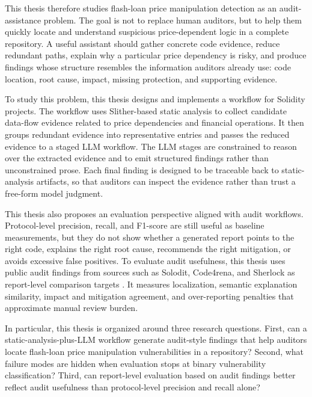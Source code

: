 This thesis therefore studies flash-loan price manipulation detection as an
audit-assistance problem. The goal is not to replace human auditors, but to
help them quickly locate and understand suspicious price-dependent logic in a
complete repository. A useful assistant should gather concrete code evidence,
reduce redundant paths, explain why a particular price dependency is risky, and
produce findings whose structure resembles the information auditors already use:
code location, root cause, impact, missing protection, and supporting evidence.

To study this problem, this thesis designs and implements a workflow
for Solidity projects. The workflow uses Slither-based static analysis
\citep{slither} to collect candidate data-flow evidence related to price
dependencies and financial operations. It then groups redundant evidence into
representative entries and passes the reduced evidence to a staged LLM workflow.
The LLM stages are constrained to reason over the extracted evidence and to
emit structured findings rather than unconstrained prose. Each final finding is
designed to be traceable back to static-analysis artifacts, so that auditors can
inspect the evidence rather than trust a free-form model judgment.

This thesis also proposes an evaluation perspective aligned with audit
workflows. Protocol-level precision, recall, and F1-score are still useful as
baseline measurements, but they do not show whether a generated report points
to the right code, explains the right root cause, recommends the right
mitigation, or avoids excessive false positives. To evaluate audit usefulness,
this thesis uses public audit findings from sources such as Solodit, Code4rena,
and Sherlock as report-level comparison targets
\citep{solodit,code4rena,sherlock}. It measures localization, semantic
explanation similarity, impact and mitigation agreement, and over-reporting
penalties that approximate manual review burden.

In particular, this thesis is organized around three research questions. First,
can a static-analysis-plus-LLM workflow generate audit-style findings that help
auditors locate flash-loan price manipulation vulnerabilities in a repository?
Second, what failure modes are hidden when evaluation stops at binary
vulnerability classification? Third, can report-level evaluation based on audit
findings better reflect audit usefulness than protocol-level precision and
recall alone?

